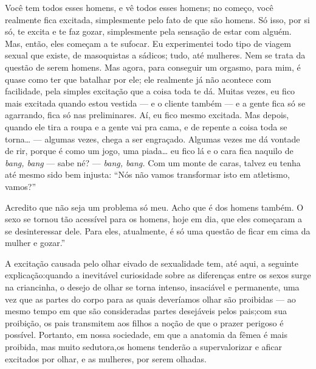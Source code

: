 Você tem todos esses homens, e vê todos esses homens; no começo,
você realmente fica excitada, simplesmente pelo fato de que são homens.
Só isso, por si só, te excita e te faz gozar, simplesmente pela
sensação de estar com alguém. Mas, então, eles começam a te sufocar. Eu
experimentei todo tipo de viagem sexual que existe, de masoquistas a
sádicos; tudo, até mulheres. Nem se trata da questão de serem homens.
Mas agora, para conseguir um orgasmo, para mim, é quase como ter que
batalhar por ele; ele realmente já não acontece com facilidade, pela
simples excitação que a coisa toda te dá. Muitas vezes, eu fico mais
excitada quando estou vestida --- e o cliente também --- e a gente
fica só se agarrando, fica só nas preliminares. Aí, eu fico mesmo
excitada. Mas depois, quando ele tira a roupa e a gente vai pra cama, e
de repente a coisa toda se torna\ldots{} --- algumas vezes, chega a ser
engraçado. Algumas vezes me dá vontade de rir, porque é como um jogo,
uma piada\ldots{} eu fico lá e o cara fica naquilo de \textit{bang, bang}
--- sabe né? --- \textit{bang, bang.} Com um monte de caras, talvez
eu tenha até mesmo sido bem injusta: ``Nós não vamos
transformar isto em atletismo, vamos?''

Acredito que não seja um problema só meu. Acho que é dos homens
também. O sexo se tornou tão acessível para os homens, hoje em dia, que
eles começaram a se desinteressar dele. Para eles, atualmente, é só
uma questão de ficar em cima da mulher e gozar.''


A excitação causada pelo olhar\idxmistolh{} eivado de sexualidade\idxinfanolhar{} tem,\idxsexuo{} até aqui,
a seguinte explicação:\idxsadivoye[|(] quando a inevitável curiosidade sobre as
diferenças entre os sexos surge na criancinha,\idxvoyrai{} o desejo de olhar se
torna intenso, insaciável e permanente, uma vez que as partes do corpo
para as quais deveríamos olhar são proibidas --- ao mesmo tempo em que
são consideradas partes desejáveis pelos pais;\idxvoysad[|(] com sua proibição, os
pais transmitem aos filhos a noção de que o prazer perigoso é possível.
Portanto, em nossa sociedade, em que a anatomia da fêmea é mais
proibida, mas muito sedutora,\idxpervenfad[|)] os homens tenderão a supervalorizar e a\idxprostenf[|)]
ficar excitados por olhar, e as mulheres, por serem olhadas.

